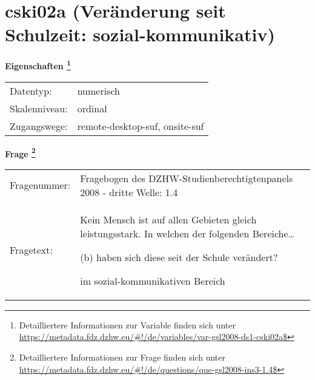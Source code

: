 
    \setcounter{footnote}{0}

    \vspace*{-1.8cm}
	\section{cski02a (Veränderung seit Schulzeit: sozial-kommunikativ)}
	\label{section:cski02a}



    \vspace*{0.5cm}
    \noindent\textbf{Eigenschaften
	\footnote{Detailliertere Informationen zur Variable finden sich unter
		\url{https://metadata.fdz.dzhw.eu/\#!/de/variables/var-gsl2008-ds1-cski02a$}}}\\
	\begin{tabularx}{\hsize}{@{}lX}
	Datentyp: & numerisch \\
	Skalenniveau: & ordinal \\
	Zugangswege: &
	  remote-desktop-suf, 
	  onsite-suf
 \\
    \end{tabularx}



				\vspace*{0.5cm}
                \noindent\textbf{Frage
	                \footnote{Detailliertere Informationen zur Frage finden sich unter
		              \url{https://metadata.fdz.dzhw.eu/\#!/de/questions/que-gsl2008-ins3-1.4$}}}\\
				\begin{tabularx}{\hsize}{@{}lX}
					Fragenummer: &
					  Fragebogen des DZHW-Studienberechtigtenpanels 2008 - dritte Welle:
					  1.4
 \\
					Fragetext: & Kein Mensch ist auf allen Gebieten gleich leistungsstark. In welchen der folgenden Bereiche…\par  (b) haben sich diese seit der Schule verändert?\par  im sozial-kommunikativen Bereich \\
				\end{tabularx}





